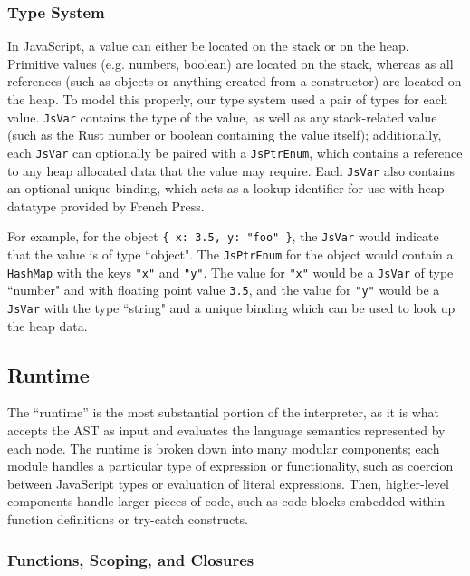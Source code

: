 \documentclass{article}
\begin{document}
\begin{multicols}{2}
\subsubsection*{Type System}

In JavaScript, a value can either be located on the stack or on the heap.
Primitive values (e.g. numbers, boolean) are located on the stack, whereas as
all references (such as objects or anything created from a constructor) are
located on the heap. To model this properly, our type system used a pair of
types for each value. \texttt{JsVar} contains the type of the value, as well as
any stack-related value (such as the Rust number or boolean containing the
value itself); additionally, each \texttt{JsVar} can optionally be paired with a
\texttt{JsPtrEnum}, which contains a reference to any heap allocated data that
the value may require. Each \texttt{JsVar} also contains an optional unique
binding, which acts as a lookup identifier for use with heap datatype provided
by French Press. \newline

For example, for the object \texttt{\{ x: 3.5, y: "foo" \}}, the \texttt{JsVar}
would indicate that the value is of type ``object". The \texttt{JsPtrEnum} for
the object would contain a \texttt{HashMap} with the keys \texttt{"x"} and
\texttt{"y"}. The value for \texttt{"x"} would be a \texttt{JsVar} of type
``number" and with floating point value \texttt{3.5}, and the value for
\texttt{"y"} would be a \texttt{JsVar} with the type ``string" and a unique
binding which can be used to look up the heap data.

\subsection{Runtime}

The ``runtime'' is the most substantial portion of the interpreter, as it is
what accepts the AST as input and evaluates the language semantics represented
by each node. The runtime is broken down into many modular components; each
module handles a particular type of expression or functionality, such as
coercion between JavaScript types or evaluation of literal expressions. Then,
higher-level components handle larger pieces of code, such as code blocks
embedded within function definitions or try-catch constructs.

\subsubsection*{Functions, Scoping, and Closures}


\end{multicols}
\end{document}
